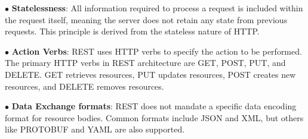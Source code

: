 $\bullet$ \textbf{Statelessness}: All information required to process a request is included within the request itself, meaning the server does not retain any state from previous requests. This principle is derived from the stateless nature of HTTP.

$\bullet$ \textbf{Action Verbs}: REST uses HTTP verbs to specify the action to be performed. The primary HTTP verbs in REST architecture are GET, POST, PUT, and DELETE. GET retrieves resources, PUT updates resources, POST creates new resources, and DELETE removes resources.

$\bullet$ \textbf{Data Exchange formats}: REST does not mandate a specific data encoding format for resource bodies. Common formats include JSON \cite{json} and XML, but others like PROTOBUF and YAML are also supported.





